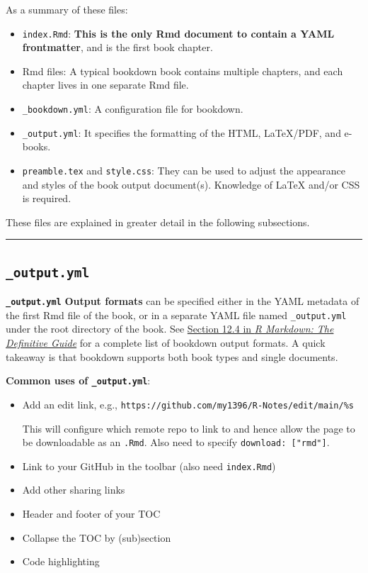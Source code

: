 \documentclass[
  a4paper,
  twoside,
  openright]{book}
\theoremstyle{definition}
\theoremstyle{definition}
\theoremstyle{definition}
\theoremstyle{definition}
\theoremstyle{remark}
\begin{document}
As a summary of these files:

\begin{itemize}
\item
  \texttt{index.Rmd}: \textbf{This is the only Rmd document to contain a YAML frontmatter}, and is the first book chapter.
\item
  Rmd files: A typical bookdown book contains multiple chapters, and each chapter lives in one separate Rmd file.
\item
  \texttt{\_bookdown.yml}: A configuration file for bookdown.
\item
  \texttt{\_output.yml}: It specifies the formatting of the HTML, LaTeX/PDF, and e-books.
\item
  \texttt{preamble.tex} and \texttt{style.css}: They can be used to adjust the appearance and styles of the book output document(s). Knowledge of LaTeX and/or CSS is required.
\end{itemize}

These files are explained in greater detail in the following subsections.

\begin{center}\rule{0.5\linewidth}{0.5pt}\end{center}

\subsection*{\texorpdfstring{\texttt{\_output.yml}}{\_output.yml}}\label{output.yml}

\textbf{\texttt{\_output.yml}} \textbf{Output formats} can be specified either in the YAML metadata of the first Rmd file of the book, or in a separate YAML file named \texttt{\_output.yml} under the root directory of the book. See \href{https://bookdown.org/yihui/rmarkdown/bookdown-output.html\#bookdown-output}{Section 12.4 in \emph{R Markdown: The Definitive Guide}} for a complete list of bookdown output formats. A quick takeaway is that bookdown supports both book types and single documents.

\textbf{Common uses of \texttt{\_output.yml}}:

\begin{itemize}
\item
  Add an edit link, e.g., \texttt{https://github.com/my1396/R-Notes/edit/main/\%s}

  This will configure which remote repo to link to and hence allow the page to be downloadable as an \texttt{.Rmd}. Also need to specify \texttt{download:\ {[}"rmd"{]}}.
\item
  Link to your GitHub in the toolbar (also need \texttt{index.Rmd})
\item
  Add other sharing links
\item
  Header and footer of your TOC
\item
  Collapse the TOC by (sub)section
\item
  Code highlighting
\end{itemize}
\end{document}

